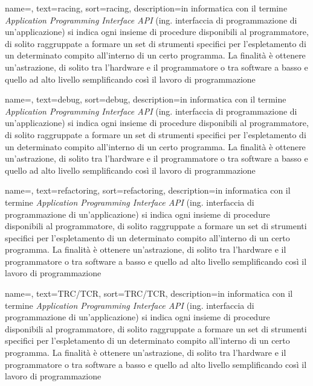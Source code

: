 {
	name=,
	text=racing,
	sort=racing,
	description={in informatica con il termine \emph{Application Programming Interface API} (ing. interfaccia di programmazione di un'applicazione) si indica ogni insieme di procedure disponibili al programmatore, di solito raggruppate a formare un set di strumenti specifici per l'espletamento di un determinato compito all'interno di un certo programma. La finalità è ottenere un'astrazione, di solito tra l'hardware e il programmatore o tra software a basso e quello ad alto livello semplificando così il lavoro di programmazione}
}

{
	name=,
	text=debug,
	sort=debug,
	description={in informatica con il termine \emph{Application Programming Interface API} (ing. interfaccia di programmazione di un'applicazione) si indica ogni insieme di procedure disponibili al programmatore, di solito raggruppate a formare un set di strumenti specifici per l'espletamento di un determinato compito all'interno di un certo programma. La finalità è ottenere un'astrazione, di solito tra l'hardware e il programmatore o tra software a basso e quello ad alto livello semplificando così il lavoro di programmazione}
}

{
	name=,
	text=refactoring,
	sort=refactoring,
	description={in informatica con il termine \emph{Application Programming Interface API} (ing. interfaccia di programmazione di un'applicazione) si indica ogni insieme di procedure disponibili al programmatore, di solito raggruppate a formare un set di strumenti specifici per l'espletamento di un determinato compito all'interno di un certo programma. La finalità è ottenere un'astrazione, di solito tra l'hardware e il programmatore o tra software a basso e quello ad alto livello semplificando così il lavoro di programmazione}
}

{
	name=,
	text=TRC/TCR,
	sort=TRC/TCR,
	description={in informatica con il termine \emph{Application Programming Interface API} (ing. interfaccia di programmazione di un'applicazione) si indica ogni insieme di procedure disponibili al programmatore, di solito raggruppate a formare un set di strumenti specifici per l'espletamento di un determinato compito all'interno di un certo programma. La finalità è ottenere un'astrazione, di solito tra l'hardware e il programmatore o tra software a basso e quello ad alto livello semplificando così il lavoro di programmazione}
}

